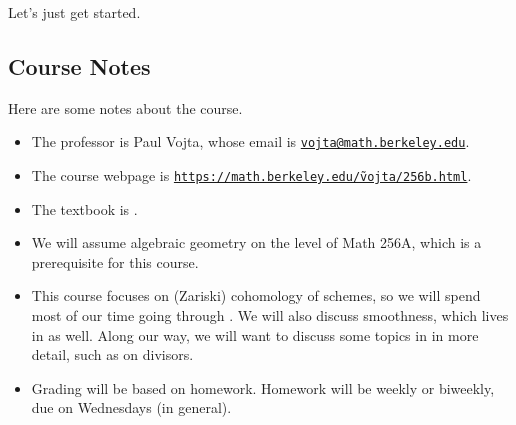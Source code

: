 \documentclass[../notes.tex]{subfiles}
\begin{document}
Let's just get started.

\subsection{Course Notes}
Here are some notes about the course.
\begin{itemize}
	\item The professor is Paul Vojta, whose email is \href{mailto:vojta@math.berkeley.edu}{\texttt{vojta@math.berkeley.edu}}.
	\item The course webpage is \href{https://math.berkeley.edu/~vojta/256b.html}{\texttt{https://math.berkeley.edu/\~vojta/256b.html}}.
	\item The textbook is \cite{hartshorne}.
	\item We will assume algebraic geometry on the level of Math 256A, which is a prerequisite for this course.
	\item This course focuses on (Zariski) cohomology of schemes, so we will spend most of our time going through \cite[Chapter~III]{hartshorne}. We will also discuss smoothness, which lives in \cite[Chapter~III]{hartshorne} as well. Along our way, we will want to discuss some topics in \cite[Chapter~II]{hartshorne} in more detail, such as on divisors.
	\item Grading will be based on homework. Homework will be weekly or biweekly, due on Wednesdays (in general).
\end{itemize}
\end{document}
